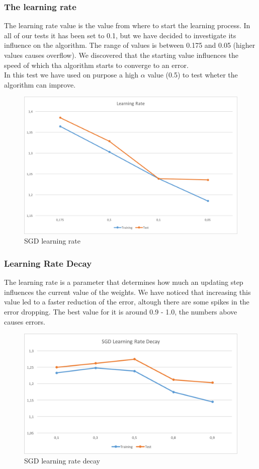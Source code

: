 \documentclass{sig-alternate-05-2015}
\begin{document}
\subsubsection{The learning rate}

The learning rate value is the value from where to start the
learning process. In all of our tests it has been set to 0.1,
but we have decided to investigate its influence on the algorithm.
The range of values is between 0.175 and 0.05 (higher values causes overflow).
We discovered that the starting value influences the speed of which tha algorithm
starts to converge to an error.\\
In this test we have used on purpose a high $\alpha$ value (0.5) to test wheter
the algorithm can improve.

\begin{figure}
    \caption{SGD learning rate}
    \centering
    \includegraphics[scale=0.35]{learning.png}
\end{figure}

\subsubsection{Learning Rate Decay}
The learning rate is a parameter that determines how much an updating step
influences the current value of the weights. We have noticed
that increasing this value led to a faster reduction of the error, altough
there are some spikes in the error dropping. The best value for it is around
0.9 - 1.0, the numbers above causes errors.

\begin{figure}
    \caption{SGD learning rate decay}
    \centering
    \includegraphics[scale=0.45]{lrdecay.png}
\end{figure}
\end{document}
